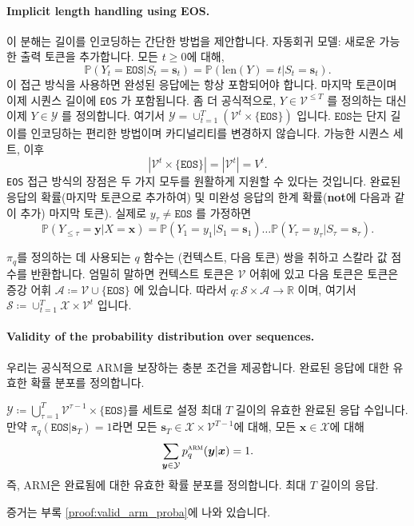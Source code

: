 \documentclass{article}
\def\s{{\bm{s}}}
\def\x{{\bm{x}}}
\def\y{{\bm{y}}}
\def\RR{{\mathbb{R}}}
\def\PP{{\mathbb{P}}}
\def\cA{{\mathcal{A}}}
\def\cS{{\mathcal{S}}}
\def\cV{{\mathcal{V}}}
\def\cX{{\mathcal{X}}}
\def\cY{{\mathcal{Y}}}
\def\arm{{\textsc{arm}}}
\def\len{{\mathrm{len}}}
\def\eos{\texttt{EOS}\xspace}
\def\voc{\cV}
\begin{document}
\paragraph{Implicit length handling using EOS.}

이 분해는 길이를 인코딩하는 간단한 방법을 제안합니다.
자동회귀 모델:  새로운 가능한 출력 토큰을 추가합니다.
모든 $t\geq 0$에 대해, 
 \begin{equation} 
 \PP (Y_t = \eos | S_t = \s _t) = \PP ( \len (Y) = t |S_t = \s _t).
 \end{equation} 
이 접근 방식을 사용하면 완성된 응답에는 항상  포함되어야 합니다.
마지막 토큰이며 이제 시퀀스 길이에 \eos 가 포함됩니다.  좀 더 공식적으로,
$Y \in \cV^{\le T}$ 를 정의하는 대신 이제 $Y \in \cY$ 를 정의합니다. 여기서 $\cY =
\cup_{t=1}^T (\cV^t \times \{\eos\})$ 입니다.  $\eos$는 단지
길이를 인코딩하는 편리한 방법이며 카디널리티를 변경하지 않습니다.
가능한 시퀀스 세트, 이후
 \begin{equation} 
| \cV ^t \times \{ \eos \}| =| \cV ^t| = V^t.
 \end{equation} 
\eos 접근 방식의 장점은 두 가지 모두를 원활하게 지원할 수 있다는 것입니다.
완료된 응답의 확률(마지막 토큰으로  추가하여) 및
미완성 응답의 한계 확률(\textbf{not}에  다음과 같이 추가)
마지막 토큰). 실제로 $y_\tau \neq \eos$ 를 가정하면
 \begin{equation} 
 \PP (Y_{ \le \tau }= \y |X= \x ) 
= \PP (Y_1 = y_1 |S_1 = \s _1) \ldots \PP (Y_ \tau =y_ \tau | S_ \tau = \s _ \tau ).
 \end{equation}


$\pi_q$를 정의하는 데 사용되는 $q$ 함수는 (컨텍스트, 다음 토큰) 쌍을 취하고
스칼라 값 점수를 반환합니다.
엄밀히 말하면 컨텍스트 토큰은 $\cV$ 어휘에 있고 다음 토큰은
토큰은 증강 어휘 $\cA \coloneqq \cV \cup \{\eos\}$ 에 있습니다.
따라서 $q \colon \cS \times \cA \to \RR$ 이며, 여기서 $\cS \coloneqq \cup_{t=1}^T
\cX \times \cV^t$ 입니다.

\paragraph{Validity of the probability distribution over sequences.}

우리는 공식적으로 ARM을 보장하는 충분 조건을 제공합니다.
완료된 응답에 대한 유효한 확률 분포를 정의합니다.
 \begin{proposition}  \label{prop:valid_arm_proba}

$\cY \coloneqq \bigcup_{\tau=1}^T \voc^{\tau-1} \times \{\eos\}$를 세트로 설정
최대 $T$ 길이의 유효한 완료된 응답 수입니다.  만약 $\pi_q(\eos|\s_T) = 1$라면 
모든 $\s_T \in \cX \times \voc^{T-1}$에 대해, 모든 $\x \in \cX$에 대해 
 \begin{equation} 
 \sum _{ \y \in \cY } p^ \arm _q( \y | \x ) = 1.
 \end{equation} 
즉, ARM은 완료됨에 대한 유효한 확률 분포를 정의합니다.
최대 $T$ 길이의 응답.
 \end{proposition} 
증거는 부록 \ref{proof:valid_arm_proba}에 나와 있습니다.
\end{document}
